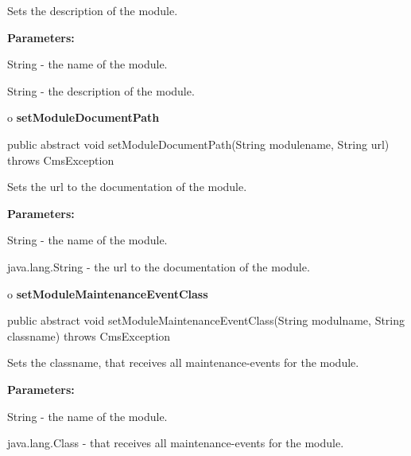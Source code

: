 \begin{description}
\htmlDD Sets the description of the module. 

\begin{description}
\item {\bf Parameters:}  

String - the name of the module.  

String - the description of the module.  
\end{description}

\end{description}

o {\bf setModuleDocumentPath} 

\begin{PRE}
 public abstract void setModuleDocumentPath(String modulename,
                                            String url) throws CmsException
\end{PRE}

\begin{description}
\htmlDD Sets the url to the documentation of the module. 

\begin{description}
\item {\bf Parameters:}  

String - the name of the module.  

java.lang.String - the url to the documentation of the module.  
\end{description}

\end{description}

o {\bf setModuleMaintenanceEventClass} 

\begin{PRE}
 public abstract void setModuleMaintenanceEventClass(String modulname,
                                                     String classname) throws CmsException
\end{PRE}

\begin{description}
\htmlDD Sets the classname, that receives all maintenance-events for the
module. 

\begin{description}
\item {\bf Parameters:}  

String - the name of the module.  

java.lang.Class - that receives all maintenance-events for the module.  
\end{description}

\end{description}

